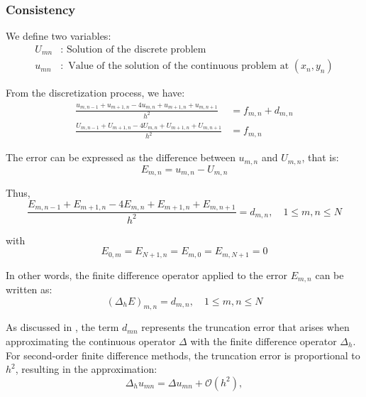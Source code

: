 \documentclass[aps,amsmath,amssymb,floatfix]{revtex4}
\begin{document}
\subsubsection{Consistency}
We define two variables:
\begin{align*}
	U_{mn} & : \text{ Solution of the discrete problem}                               \\
	u_{mn} & : \text{ Value of the solution of the continuous problem at } (x_n, y_n) 
\end{align*}

From the discretization process, we have:
\begin{align*}
	\frac{u_{m, n-1} + u_{m+1, n} - 4u_{m, n} + u_{m+1, n} + u_{m, n+1}}{h^2} & = f_{m,n} + d_{m,n} \\
	\frac{U_{m, n-1} + U_{m+1, n} - 4U_{m, n} + U_{m+1, n} + U_{m, n+1}}{h^2} & = f_{m,n}           
\end{align*}

The error can be expressed as the difference between $u_{m,n}$ and $U_{m,n}$, that is:
\begin{equation*}
	E_{m,n} = u_{m,n} - U_{m,n}
\end{equation*}

Thus,
\begin{equation*}
	\frac{E_{m, n-1} + E_{m+1, n} - 4E_{m, n} + E_{m+1, n} + E_{m, n+1}}{h^2} = d_{m,n}, \quad 1 \leq m, n \leq N
\end{equation*}

with
\begin{equation*}
	E_{0,m} = E_{N+1, n} = E_{m, 0} = E_{m, N+1} = 0
\end{equation*}

In other words, the finite difference operator applied to the error $E_{m,n}$ can be written as:
\begin{equation*}
	\left(\Delta_h E \right)_{m,n} = d_{m, n}, \quad 1 \leq m, n \leq N 
\end{equation*}

As discussed in \cite{Chen2014}, the term $d_{mn}$ represents the truncation error that arises when approximating the continuous operator $\Delta$ with the finite difference operator $\Delta_h$. For second-order finite difference methods, the truncation error is proportional to $h^2$, resulting in the approximation:
\begin{equation*}
	\Delta_h u_{mn} = \Delta u_{mn} + \mathcal{O}(h^2),
\end{equation*}
\end{document}
